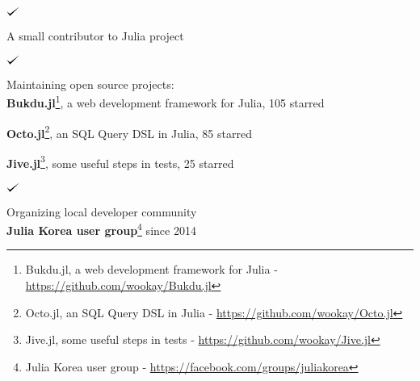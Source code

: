 \documentclass[margin,line]{res}
\def\checkmark{\tikz\fill[scale=0.4](0,.35) -- (.25,0) -- (1,.7) -- (.25,.15) -- cycle;}
\newenvironment{list1}{
  \begin{list}{$\checkmark$}{
      \setlength{\parsep}{0in} \setlength{\parskip}{0.3cm}
      \setlength{\topsep}{0in} \setlength{\partopsep}{0.3cm}
      \setlength{\leftmargin}{0.2in}}}{\end{list}}
\begin{document}
\begin{resume}
\begin{list1}
\item A small contributor to Julia project
\end{list1}

\begin{list1}
\item Maintaining open source projects: \\
  {\bf Bukdu.jl}\footnote{ Bukdu.jl, a web development framework for Julia - \url{https://github.com/wookay/Bukdu.jl}}, a web development framework for Julia, 105 starred \hfill

  {\bf Octo.jl}\footnote{ Octo.jl, an SQL Query DSL in Julia - \url{https://github.com/wookay/Octo.jl}}, an SQL Query DSL in Julia, 85 starred \hfill

  {\bf Jive.jl}\footnote{ Jive.jl, some useful steps in tests - \url{https://github.com/wookay/Jive.jl}}, some useful steps in tests, 25 starred \hfill
\end{list1}

\begin{list1}
\item Organizing local developer community \\
  {\bf Julia Korea user group}\footnote{ Julia Korea user group - \url{https://facebook.com/groups/juliakorea}} since 2014
\end{list1}

\end{resume}
\end{document}
